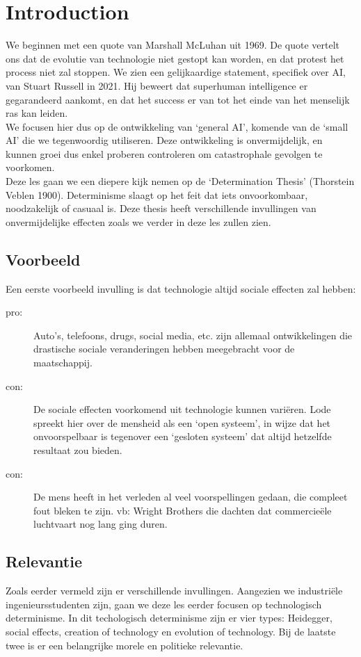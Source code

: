 \documentclass[../summary.tex]{subfiles}
\begin{document}
	
	\section{Introduction}
	We beginnen met een quote van Marshall McLuhan uit 1969. De quote vertelt ons dat de evolutie van technologie niet gestopt kan worden, en dat protest het process niet zal stoppen. We zien een gelijkaardige statement, specifiek over AI, van Stuart Russell in 2021. Hij beweert dat superhuman intelligence er gegarandeerd aankomt, en dat het success er van tot het einde van het menselijk ras kan leiden.  \\
	
	We focusen hier dus op de ontwikkeling van `general AI', komende van de `small AI' die we tegenwoordig utiliseren. Deze ontwikkeling is onvermijdelijk, en kunnen groei dus enkel proberen controleren om catastrophale gevolgen te voorkomen. \\
	
	Deze les gaan we een diepere kijk nemen op de `Determination Thesis' (Thorstein Veblen 1900). Determinisme slaagt op het feit dat iets onvoorkombaar, noodzakelijk of casuaal is. Deze thesis heeft verschillende invullingen van onvermijdelijke effecten zoals we verder in deze les zullen zien.  \\
	
	\subsection{Voorbeeld}
	Een eerste voorbeeld invulling is dat technologie altijd sociale effecten zal hebben:
	\begin{description}
		\item[pro: ] Auto's, telefoons, drugs, social media, etc. zijn allemaal ontwikkelingen die drastische sociale veranderingen hebben meegebracht voor de maatschappij.
		\item[con: ] De sociale effecten voorkomend uit technologie kunnen variëren. Lode spreekt hier over de mensheid als een `open systeem', in wijze dat het onvoorspelbaar is tegenover een `gesloten systeem' dat altijd hetzelfde resultaat zou bieden.
		\item[con: ]  De mens heeft in het verleden al veel voorspellingen gedaan, die compleet fout bleken te zijn. vb: Wright Brothers die dachten dat commercieële luchtvaart nog lang ging duren.
	\end{description}
	
	\subsection{Relevantie}
	Zoals eerder vermeld zijn er verschillende invullingen. Aangezien we industriële ingenieursstudenten zijn, gaan we deze les eerder focusen op technologisch determinisme. In dit techologisch determinisme zijn er vier types: Heidegger, social effects, creation of technology en evolution of technology. Bij de laatste twee is er een belangrijke morele en politieke relevantie.
	
\end{document}
